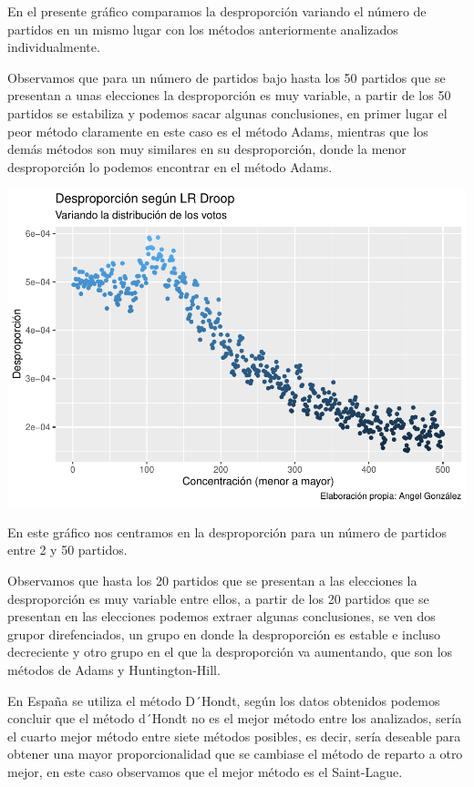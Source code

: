 \documentclass[12pt,a4paper,]{book}
\numberwithin{dummy}{section}
\theoremstyle{ocrenumbox}
\theoremstyle{blacknumex}
\theoremstyle{blacknumbox}
\theoremstyle{ocrenum}
\theoremstyle{ocrenum}
\begin{document}
En el presente gráfico comparamos la desproporción variando el número de
partidos en un mismo lugar con los métodos anteriormente analizados
individualmente.

Observamos que para un número de partidos bajo hasta los 50 partidos que
se presentan a unas elecciones la desproporción es muy variable, a
partir de los 50 partidos se estabiliza y podemos sacar algunas
conclusiones, en primer lugar el peor método claramente en este caso es
el método Adams, mientras que los demás métodos son muy similares en su
desproporción, donde la menor desproporción lo podemos encontrar en el
método Adams.

\begin{center}\includegraphics[width=0.95\linewidth]{figurasR/unnamed-chunk-48-1} \end{center}

En este gráfico nos centramos en la desproporción para un número de
partidos entre 2 y 50 partidos.

Observamos que hasta los 20 partidos que se presentan a las elecciones
la desproporción es muy variable entre ellos, a partir de los 20
partidos que se presentan en las elecciones podemos extraer algunas
conclusiones, se ven dos grupor direfenciados, un grupo en donde la
desproporción es estable e incluso decreciente y otro grupo en el que la
desproporción va aumentando, que son los métodos de Adams y
Huntington-Hill.

En España se utiliza el método D´Hondt, según los datos obtenidos
podemos concluir que el método d´Hondt no es el mejor método entre los
analizados, sería el cuarto mejor método entre siete métodos posibles,
es decir, sería deseable para obtener una mayor proporcionalidad que se
cambiase el método de reparto a otro mejor, en este caso observamos que
el mejor método es el Saint-Lague.
\end{document}
